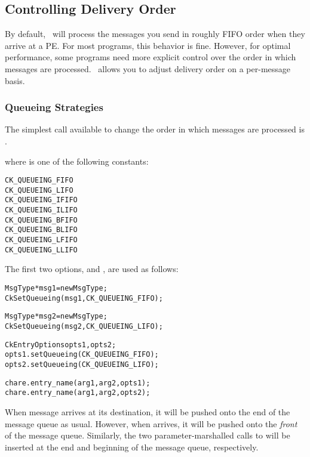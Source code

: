 \subsection{Controlling Delivery Order}

By default, \charmpp\ will process the messages you send in roughly
FIFO order when they arrive at a PE.
For most programs, this behavior is fine.  However, for optimal
performance, some programs need more explicit control over the order
in which messages are processed. \charmpp\ allows you to adjust
delivery order on a per-message basis.


\subsubsection{Queueing Strategies}
\label{queueing strategies}

The simplest call available to change the order in which messages
are processed is .


where  is one of the following constants:

\begin{alltt}
  CK_QUEUEING_FIFO
  CK_QUEUEING_LIFO
  CK_QUEUEING_IFIFO
  CK_QUEUEING_ILIFO
  CK_QUEUEING_BFIFO
  CK_QUEUEING_BLIFO
  CK_QUEUEING_LFIFO
  CK_QUEUEING_LLIFO
\end{alltt}

The first two options,   and
, are used as follows:

\begin{alltt}
  MsgType *msg1 = new MsgType ;
  CkSetQueueing(msg1, CK_QUEUEING_FIFO);

  MsgType *msg2 = new MsgType ;
  CkSetQueueing(msg2, CK_QUEUEING_LIFO);

  CkEntryOptions opts1, opts2;
  opts1.setQueueing(CK_QUEUEING_FIFO);
  opts2.setQueueing(CK_QUEUEING_LIFO);

  chare.entry_name(arg1, arg2, opts1);
  chare.entry_name(arg1, arg2, opts2);
\end{alltt}

When message  arrives at its destination, it will be pushed
onto the end of the message queue as usual.  However, when 
arrives, it will be pushed onto the {\em front} of the message
queue. Similarly, the two parameter-marshalled calls to 
will be inserted at the end and beginning of the message queue,
respectively.

